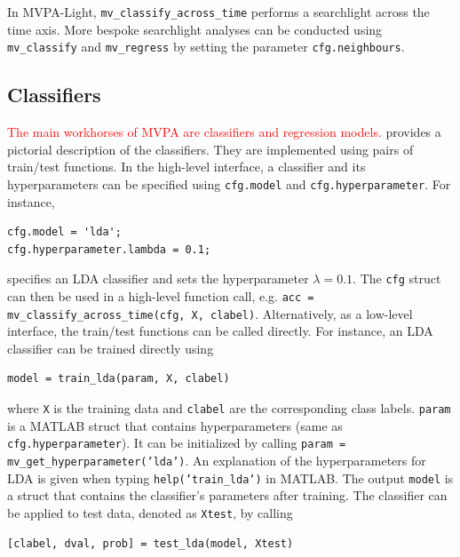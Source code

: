 \documentclass[utf8]{frontiersSCNS} %
\newcommand{\ttt}[1]{\texttt{#1}}
\newcommand{\red}[1]{\textcolor{red}{#1}}
\begin{document}
In MVPA-Light, \ttt{mv\_classify\_across\_time} performs a searchlight across the time axis. More bespoke searchlight analyses can be conducted using \ttt{mv\_classify} and \ttt{mv\_regress} by setting the parameter \ttt{cfg.neighbours}.

\subsection{Classifiers}\label{sec:classifiers}

\red{The main workhorses of MVPA are classifiers and regression models.}  provides a pictorial description of the classifiers. They are implemented using pairs of train/test functions. In the high-level interface, a classifier and its hyperparameters can be specified using \ttt{cfg.model} and \ttt{cfg.hyperparameter}. For instance,

\begin{verbatim}
cfg.model = 'lda';
cfg.hyperparameter.lambda = 0.1;
\end{verbatim}

specifies an LDA classifier and sets the hyperparameter $\lambda = 0.1$. The \ttt{cfg} struct can then be used in a high-level function call, e.g. \ttt{acc = mv\_classify\_across\_time(cfg, X, clabel)}.
Alternatively, as a low-level interface, the train/test functions can be called directly. For instance, an LDA classifier can be trained directly using

\begin{verbatim}
model = train_lda(param, X, clabel)
\end{verbatim}

where \ttt{X} is the training data and \ttt{clabel} are the corresponding class labels. \ttt{param} is a MATLAB struct that contains hyperparameters (same as \ttt{cfg.hyperparameter}). It can be initialized by calling \ttt{param = mv\_get\_hyperparameter('lda')}. An explanation of the hyperparameters for LDA is given when typing \ttt{help('train\_lda')} in MATLAB. 
The output \ttt{model} is a struct that contains the classifier's parameters after training. The classifier can be applied to test data, denoted as \ttt{Xtest}, by calling

\begin{verbatim}
[clabel, dval, prob] = test_lda(model, Xtest)
\end{verbatim}
\end{document}
